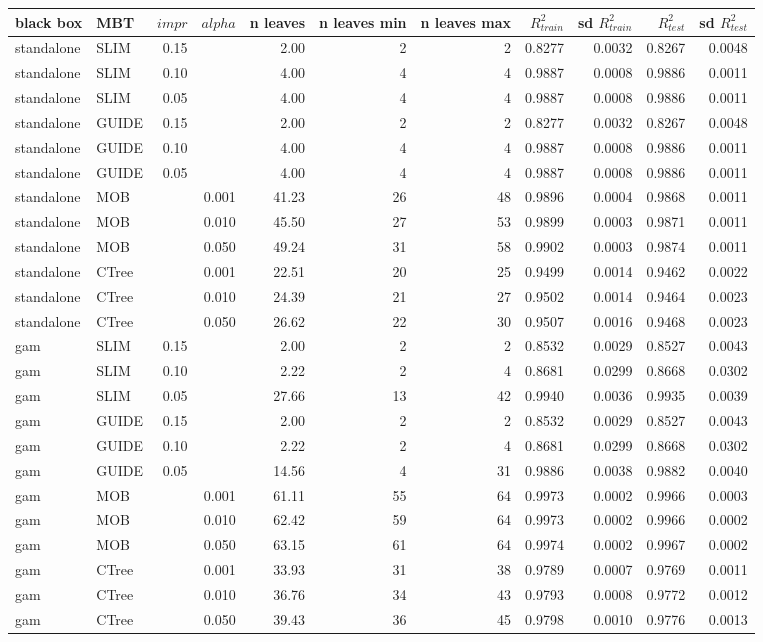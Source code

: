 \begin{table}[!htb]

\centering \tiny
\begin{tabular}[t]{l|l|r|r|r|r|r|r|r|r|r}
\hline
black box & MBT & $impr$ & $alpha$ & n leaves & n leaves min & n leaves max &  $R^2_{train}$ & sd $R^2_{train}$ & $R^2_{test}$ & sd $R^2_{test}$\\
\hline
standalone & SLIM & 0.15 & & 2.00 & 2 & 2 & 0.8277 & 0.0032 & 0.8267 & 0.0048\\
standalone & SLIM & 0.10 & & 4.00 & 4 & 4 & 0.9887 & 0.0008 & 0.9886 & 0.0011\\
standalone & SLIM & 0.05 & & 4.00 & 4 & 4 & 0.9887 & 0.0008 & 0.9886 & 0.0011\\
standalone & GUIDE & 0.15 & & 2.00 & 2 & 2 & 0.8277 & 0.0032 & 0.8267 & 0.0048\\
standalone & GUIDE & 0.10 & & 4.00 & 4 & 4 & 0.9887 & 0.0008 & 0.9886 & 0.0011\\
standalone & GUIDE & 0.05 & & 4.00 & 4 & 4 & 0.9887 & 0.0008 & 0.9886 & 0.0011\\
standalone & MOB & & 0.001 & 41.23 & 26 & 48 & 0.9896 & 0.0004 & 0.9868 & 0.0011\\
standalone & MOB & & 0.010 & 45.50 & 27 & 53 & 0.9899 & 0.0003 & 0.9871 & 0.0011\\
standalone & MOB & & 0.050 & 49.24 & 31 & 58 & 0.9902 & 0.0003 & 0.9874 & 0.0011\\
standalone & CTree & & 0.001 & 22.51 & 20 & 25 & 0.9499 & 0.0014 & 0.9462 & 0.0022\\
standalone & CTree & & 0.010 & 24.39 & 21 & 27 & 0.9502 & 0.0014 & 0.9464 & 0.0023\\
standalone & CTree & & 0.050 & 26.62 & 22 & 30 & 0.9507 & 0.0016 & 0.9468 & 0.0023\\

\hline
gam & SLIM & 0.15 & & 2.00 & 2 & 2 & 0.8532 & 0.0029 & 0.8527 & 0.0043\\
gam & SLIM & 0.10 & & 2.22 & 2 & 4 & 0.8681 & 0.0299 & 0.8668 & 0.0302\\
gam & SLIM & 0.05 & & 27.66 & 13 & 42 & 0.9940 & 0.0036 & 0.9935 & 0.0039\\
gam & GUIDE & 0.15 & & 2.00 & 2 & 2 & 0.8532 & 0.0029 & 0.8527 & 0.0043\\
gam & GUIDE & 0.10 & & 2.22 & 2 & 4 & 0.8681 & 0.0299 & 0.8668 & 0.0302\\
gam & GUIDE & 0.05 & & 14.56 & 4 & 31 & 0.9886 & 0.0038 & 0.9882 & 0.0040\\
gam & MOB & & 0.001 & 61.11 & 55 & 64 & 0.9973 & 0.0002 & 0.9966 & 0.0003\\
gam & MOB & & 0.010 & 62.42 & 59 & 64 & 0.9973 & 0.0002 & 0.9966 & 0.0002\\
gam & MOB & & 0.050 & 63.15 & 61 & 64 & 0.9974 & 0.0002 & 0.9967 & 0.0002\\
gam & CTree & & 0.001 & 33.93 & 31 & 38 & 0.9789 & 0.0007 & 0.9769 & 0.0011\\
gam & CTree & & 0.010 & 36.76 & 34 & 43 & 0.9793 & 0.0008 & 0.9772 & 0.0012\\
gam & CTree & & 0.050 & 39.43 & 36 & 45 & 0.9798 & 0.0010 & 0.9776 & 0.0013\\


\end{tabular}
\end{table}
